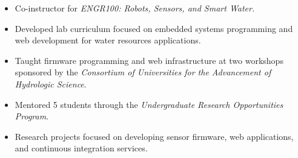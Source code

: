 \begin{itemize}
\item Co-instructor for \textit{ENGR100: Robots, Sensors, and Smart Water.}
\item Developed lab curriculum focused on embedded systems programming and web
  development for water resources applications.
\end{itemize}

\divider


\begin{itemize}
\item Taught firmware programming and web infrastructure at two workshops sponsored
  by the \textit{Consortium of Universities for the Advancement of Hydrologic Science}.
\end{itemize}

\divider


\begin{itemize}
\item Mentored 5 students through the \textit{Undergraduate Research
    Opportunities Program}.
\item Research projects focused on developing sensor firmware, web applications,
  and continuous integration services.
\end{itemize}